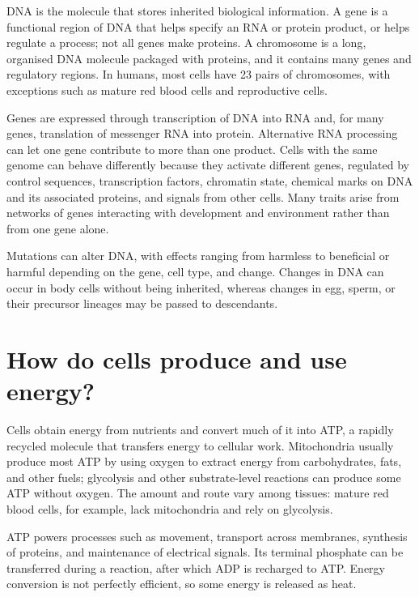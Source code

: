 \documentclass[11pt,oneside]{report}
\begin{document}
DNA is the molecule that stores inherited biological information. A gene is a
functional region of DNA that helps specify an RNA or protein product, or helps
regulate a process; not all genes make proteins. A chromosome is a long,
organised DNA molecule packaged with proteins, and it contains many genes and
regulatory regions. In humans, most cells have 23 pairs of chromosomes, with
exceptions such as mature red blood cells and reproductive cells.

Genes are expressed through transcription of DNA into RNA and, for many genes,
translation of messenger RNA into protein. Alternative RNA processing can let
one gene contribute to more than one product. Cells with the same genome can
behave differently because they activate different genes, regulated by control
sequences, transcription factors, chromatin state, chemical marks on DNA and its
associated proteins, and signals from other cells. Many traits arise from
networks of genes interacting with development and environment rather than from
one gene alone.

Mutations can alter DNA, with effects ranging from harmless to beneficial or
harmful depending on the gene, cell type, and change. Changes in DNA can occur
in body cells without being inherited, whereas changes in egg, sperm, or their
precursor lineages may be passed to descendants.

\section{How do cells produce and use energy?}

Cells obtain energy from nutrients and convert much of it into ATP, a rapidly
recycled molecule that transfers energy to cellular work. Mitochondria usually
produce most ATP by using oxygen to extract energy from carbohydrates, fats,
and other fuels; glycolysis and other substrate-level reactions can produce
some ATP without oxygen. The amount and route vary among tissues: mature red
blood cells, for example, lack mitochondria and rely on glycolysis.

ATP powers processes such as movement, transport across membranes, synthesis of
proteins, and maintenance of electrical signals. Its terminal phosphate can be
transferred during a reaction, after which ADP is recharged to ATP. Energy
conversion is not perfectly efficient, so some energy is released as heat.
\end{document}

